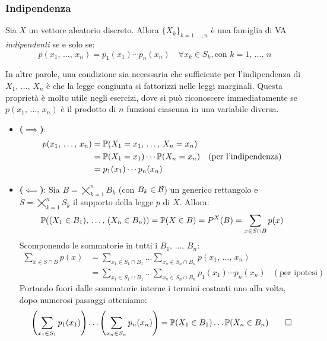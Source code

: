 \subsubsection{Indipendenza}

\begin{prop}
  Sia $X$ un vettore aleatorio discreto. Allora $\{ X_k \}_{k=1,\dots,n}$ è una famiglia di VA \emph{indipendenti} se e solo se:
  $$p(x_1, \, \dots, \, x_n) = p_1(x_1) \cdots p_n(x_n) \quad \forall x_k \in S_k, \text{con } k = 1, \, \dots, \, n$$
\end{prop}
In altre parole, una condizione sia necessaria che sufficiente per l'indipendenza di $X_1,\, \dots, \, X_n$ è che la legge congiunta si fattorizzi nelle leggi marginali. Questa proprietà è molto utile negli esercizi, dove si può riconoscere immediatamente se $p(x_1, \, \dots, \, x_n)$ è il prodotto di $n$ funzioni ciascuna in una variabile diversa.

\begin{dimo}
  \Fixvmode
  \begin{itemize}
    \item \textbf{($\implies$)}:
      \begin{align*}
      p(x_1, \, \dots, \, x_n)
      &= \mathbb P(X_1 = x_1, \, \dots, \, X_n = x_n) \\
      &= \mathbb P(X_1 = x_1)  \cdots \mathbb P(X_n = x_n) & (\text{per l'indipendenza})\\
      &= p_1(x_1) \cdots p_n(x_n)
      \end{align*}
    \item \textbf{($\impliedby$)}: Sia $B = \bigtimes\limits_{k=1}^n B_k$ (con $B_k \in \mathcal B$) un generico rettangolo e $S = \bigtimes\limits_{k=1}^n S_k$ il supporto della legge $p$ di $X$.
	Allora:
      $$
      \mathbb P((X_1 \in B_1), \, \dots, \, (X_n \in B_n))
       = \mathbb P(X \in B) = P^X(B) = \sum_{x \in S \cap B} p(x)
      $$
      Scomponendo le sommatorie in tutti i $B_1, \, \dots, \, B_n$:
      \begin{align*}
      \sum_{x \in S \cap B} p(x)
      & = \sum_{x_1 \in S_1 \cap B_1} \dots \sum_{x_n \in S_n \cap B_n} p(x_1, \, \dots, \, x_n) \\
      & = \sum_{x_1 \in S_1 \cap B_1} \dots \sum_{x_n \in S_n \cap B_n} p_1(x_1) \cdots p_n(x_n) & (\text{per ipotesi})
      \end{align*}
      Portando fuori dalle sommatorie interne i termini costanti uno alla volta, dopo numerosi passaggi otteniamo:
      $$\left( \sum_{x_1 \in S_1} p_1(x_1) \right) \dots \relax \left( \sum_{x_n \in S_n} p_n(x_n) \right) = \mathbb P(X_1 \in B_1) \dots \mathbb P(X_n \in B_n) \qedhere$$
  \end{itemize}
\end{dimo}

